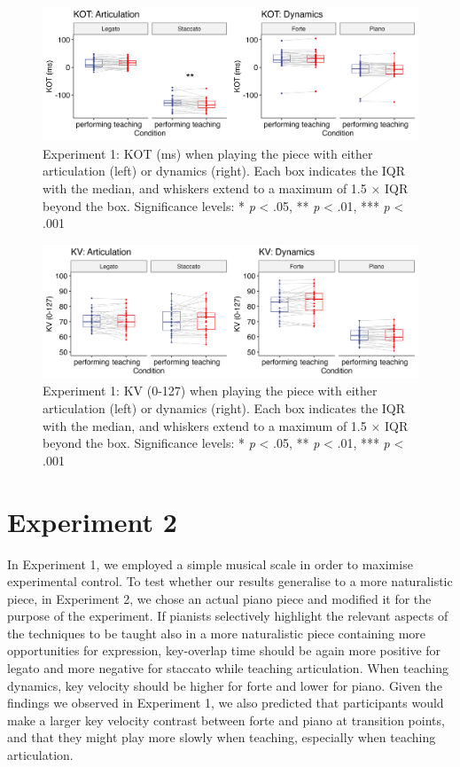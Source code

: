 \documentclass[
  english,
  man,floatsintext]{apa6}
\begin{document}
\begin{figure}
\includegraphics[width=1\linewidth]{manuscript_files/figure-latex/plot-kot-1-1} \caption{\label{fig:kot-1}Experiment 1: KOT (ms) when playing the piece with either articulation (left) or dynamics (right). Each box indicates the IQR with the median, and whiskers extend to a maximum of 1.5 × IQR beyond the box. Significance levels: * \textit{p} < .05, ** \textit{p} < .01, *** \textit{p} < .001}\label{fig:plot-kot-1}
\end{figure}

\begin{figure}
\includegraphics[width=1\linewidth]{manuscript_files/figure-latex/plot-vel-1-1} \caption{\label{fig:vel-1}Experiment 1: KV (0-127) when playing the piece with either articulation (left) or dynamics (right). Each box indicates the IQR with the median, and whiskers extend to a maximum of 1.5 × IQR beyond the box. Significance levels: * \textit{p} < .05, ** \textit{p} < .01, *** \textit{p} < .001}\label{fig:plot-vel-1}
\end{figure}

\newpage

\hypertarget{experiment-2}{%
\section{Experiment 2}\label{experiment-2}}

In Experiment 1, we employed a simple musical scale in order to maximise experimental control. To test whether our results generalise to a more naturalistic piece, in Experiment 2, we chose an actual piano piece and modified it for the purpose of the experiment. If pianists selectively highlight the relevant aspects of the techniques to be taught also in a more naturalistic piece containing more opportunities for expression, key-overlap time should be again more positive for legato and more negative for staccato while teaching articulation. When teaching dynamics, key velocity should be higher for forte and lower for piano. Given the findings we observed in Experiment 1, we also predicted that participants would make a larger key velocity contrast between forte and piano at transition points, and that they might play more slowly when teaching, especially when teaching articulation.
\end{document}
